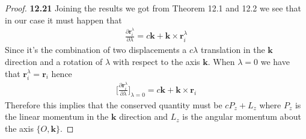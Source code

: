 \documentclass[11pt]{article}
\theoremstyle{definition}
\begin{document}
\begin{proof}{\textbf{12.21}}
    Joining the results we got from Theorem 12.1 and 12.2 we see that in our
    case it must happen that
    \begin{align*}
        \frac{\partial \bm{r}_i^\lambda}{\partial \lambda}
        = c\bm{k} + \bm{k} \times \bm{r}_i^{\lambda}
    \end{align*}
    Since it's the combination of two displacements a $c\lambda$ translation
    in the $\bm{k}$ direction and a rotation of $\lambda$ with respect to the
    axis $\bm{k}$.
    When $\lambda = 0$ we have that $\bm{r}_i^\lambda = \bm{r}_i$ hence
    \begin{align*}
        \bigg[\frac{\partial \bm{r}_i^\lambda}{\partial \lambda}\bigg]_{\lambda = 0}
        = c\bm{k} + \bm{k} \times \bm{r}_i
    \end{align*}  
    Therefore this implies that the conserved quantity must be $cP_z + L_z$
    where $P_z$ is the linear momentum in the $\bm{k}$ direction and
    $L_z$ is the angular momentum about the axis $\{O, \bm{k}\}$.
\end{proof}
\cleardoublepage
\end{document}
